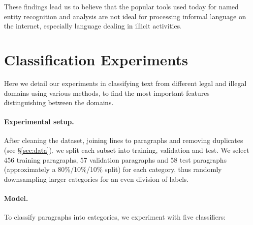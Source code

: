 \documentclass[11pt,a4paper]{article}
\begin{document}
These findings lead us to believe that the popular tools used today
for named entity recognition and analysis are not ideal for processing
informal language on the internet, especially language dealing in
illicit activities. 

\section{Classification Experiments}

Here we detail our experiments in classifying text from different legal and
illegal domains using various methods, to find the most important features
distinguishing between the domains.

\paragraph{Experimental setup.}

After cleaning the dataset, joining lines to paragraphs and removing duplicates
(see \S\ref{sec:data}), we split each subset into training, validation and test.
We select 456 training paragraphs, 57 validation paragraphs and
58 test paragraphs (approximately a 80\%/10\%/10\% split) for each category,
thus randomly downsampling larger categories for an even division of labels.

\paragraph{Model.}

To classify paragraphs into categories, we experiment with five classifiers:
\end{document}
